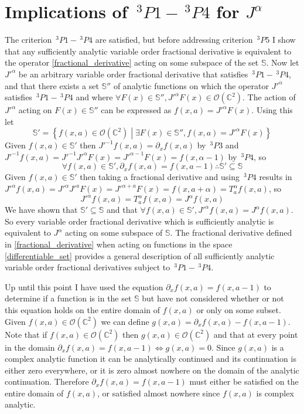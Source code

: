 \documentclass[%
 onecolumn,
 amsmath, amssymb, aps, pra, 10pt
]{revtex4-2}
\begin{document}
\section*{Implications of $\,^3P1 - \,^3P4$ for $J^{\alpha}$}
The criterion $\,^3P1 - \,^3P4$ are satisfied, but before addressing criterion $\,^3P5$ I show that any sufficiently analytic variable order fractional derivative is equivalent to the operator \eqref{fractional_derivative} acting on some subspace of the set $\mathbb{S}$. Now let $J'^{\alpha}$ be an arbitrary variable order fractional derivative that satisfies $\,^3P1 - \,^3P4$, and that there exists a set $\mathbb{S}''$ of analytic functions on which the operator $J'^{\alpha}$ satisfies $\,^3P1 - \,^3P4$ and where $\forall F(x) \in \mathbb{S}'', J'^{\alpha}F(x) \in \mathcal{O}(\mathbb{C}^2)$. The action of $J'^{\alpha}$ acting on $F(x) \in \mathbb{S}''$ can be expressed as $f(x, a) = J'^{\alpha} F(x)$. Using this let
$$\mathbb{S}' = \left\lbrace f(x, a) \in \mathcal{O}(\mathbb{C}^2) \middle| \exists F(x) \in \mathbb{S}'', f(x, a) = J'^{\alpha} F(x) \right\rbrace$$
Given $f(x, a) \in \mathbb{S}'$ then $J'^{-1}f(x, a) = \partial_x f(x, a)$ by $\,^3P3$ and $J'^{-1} f(x, a) = J'^{-1}J'^{\alpha} F(x) = J'^{\alpha - 1} F(x) = f(x, \alpha - 1)$ by $\,^3P4$, so
$$\forall f(x, a) \in \mathbb{S}', \partial_x f(x, a) = f(x, a - 1) \therefore \mathbb{S}' \subseteq \mathbb{S}$$
Given $f(x, a) \in \mathbb{S}'$ then taking a fractional derivative and using $\,^3P4$ results in $J'^{\alpha} f(x, a) = J'^{\alpha}J'^{a} F(x) = J'^{\alpha + a} F(x) = f(x, a + \alpha) = T_{a}^{\alpha} f(x, a)$, so
$$J'^{\alpha} f(x,a) = T_{a}^{\alpha} f(x, a) = J^{\alpha} f(x, a)$$
We have shown that $\mathbb{S}' \subseteq \mathbb{S}$ and that $\forall f(x, a) \in \mathbb{S}', J'^{\alpha} f(x, a) = J^{\alpha} f(x, a)$. So every variable order fractional derivative which is sufficiently analytic is equivalent to $J^{\alpha}$ acting on some subspace of $\mathbb{S}$. The fractional derivative defined in \eqref{fractional_derivative} when acting on functions in the space \eqref{differentiable_set} provides a general description of all sufficiently analytic variable order fractional derivatives subject to $\,^3P1 - \,^3P4$.

Up until this point I have used the equation $\partial_x f(x, a) = f(x, a - 1)$ to determine if a function is in the set $\mathbb{S}$ but have not considered whether or not this equation holds on the entire domain of $f(x, a)$ or only on some subset. Given $f(x, a) \in \mathcal{O}(\mathbb{C}^2)$ we can define $g(x, a) = \partial_x f(x, a) - f(x, a - 1)$. Note that if $f(x, a) \in \mathcal{O}(\mathbb{C}^2)$ then $g(x, a) \in \mathcal{O}(\mathbb{C}^2)$ and that at every point in the domain $\partial_x f(x, a) = f(x, a - 1) \iff g(x, a) = 0$. Since $g(x, a)$ is a complex analytic function it can be analytically continued and its continuation is either zero everywhere, or it is zero almost nowhere on the domain of the analytic continuation. Therefore $\partial_x f(x, a) = f(x, a - 1)$ must either be satisfied on the entire domain of $f(x, a)$, or satisfied almost nowhere since $f(x, a)$ is complex analytic.
\end{document}
